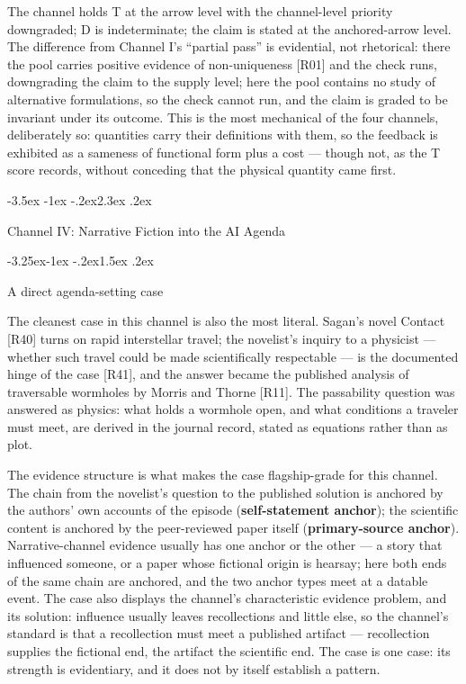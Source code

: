 \documentclass[11pt,a4paper]{article}
\makeatletter
\renewcommand\section{\@startsection{section}{1}{\z@}%
  {-3.5ex \@plus -1ex \@minus -.2ex}{2.3ex \@plus .2ex}%
  {\normalfont\Large\bfseries\raggedright}}
\renewcommand\subsection{\@startsection{subsection}{2}{\z@}%
  {-3.25ex\@plus -1ex \@minus -.2ex}{1.5ex \@plus .2ex}%
  {\normalfont\large\bfseries\raggedright}}
\makeatother
\begin{document}
The channel holds T at the arrow level with the channel-level priority downgraded; D is indeterminate; the claim is stated at the anchored-arrow level. The difference from Channel I's ``partial pass'' is evidential, not rhetorical: there the pool carries positive evidence of non-uniqueness [R01] and the check runs, downgrading the claim to the supply level; here the pool contains no study of alternative formulations, so the check cannot run, and the claim is graded to be invariant under its outcome. This is the most mechanical of the four channels, deliberately so: quantities carry their definitions with them, so the feedback is exhibited as a sameness of functional form plus a cost — though not, as the T score records, without conceding that the physical quantity came first.

\section{Channel IV: Narrative Fiction into the AI Agenda}

\subsection{A direct agenda-setting case}

The cleanest case in this channel is also the most literal. Sagan's novel Contact [R40] turns on rapid interstellar travel; the novelist's inquiry to a physicist — whether such travel could be made scientifically respectable — is the documented hinge of the case [R41], and the answer became the published analysis of traversable wormholes by Morris and Thorne [R11]. The passability question was answered as physics: what holds a wormhole open, and what conditions a traveler must meet, are derived in the journal record, stated as equations rather than as plot.

The evidence structure is what makes the case flagship-grade for this channel. The chain from the novelist's question to the published solution is anchored by the authors' own accounts of the episode (\textbf{self-statement anchor}); the scientific content is anchored by the peer-reviewed paper itself (\textbf{primary-source anchor}). Narrative-channel evidence usually has one anchor or the other — a story that influenced someone, or a paper whose fictional origin is hearsay; here both ends of the same chain are anchored, and the two anchor types meet at a datable event. The case also displays the channel's characteristic evidence problem, and its solution: influence usually leaves recollections and little else, so the channel's standard is that a recollection must meet a published artifact — recollection supplies the fictional end, the artifact the scientific end. The case is one case: its strength is evidentiary, and it does not by itself establish a pattern.
\end{document}
